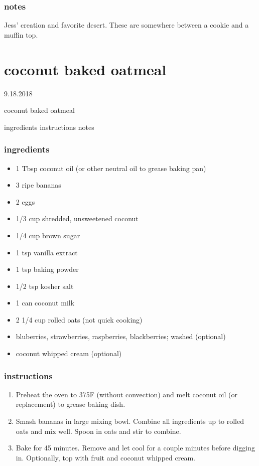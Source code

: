\documentclass[]{book}
\providecommand{\tightlist}{%
  \setlength{\itemsep}{0pt}\setlength{\parskip}{0pt}}
\begin{document}
\hypertarget{notes-21}{%
\subsection{notes}\label{notes-21}}

Jess' creation and favorite desert. These are somewhere between a cookie and a muffin top.

\hypertarget{coconut-baked-oatmeal}{%
\chapter{coconut baked oatmeal}\label{coconut-baked-oatmeal}}

9.18.2018

coconut baked oatmeal

ingredients \textbar{}
instructions \textbar{}
notes

\hypertarget{ingredients-22}{%
\subsection{ingredients}\label{ingredients-22}}

\begin{itemize}
\tightlist
\item
  1 Tbsp coconut oil (or other neutral oil to grease baking pan)
\item
  3 ripe bananas
\item
  2 eggs
\item
  1/3 cup shredded, unsweetened coconut
\item
  1/4 cup brown sugar
\item
  1 tsp vanilla extract
\item
  1 tsp baking powder
\item
  1/2 tsp kosher salt
\item
  1 can coconut milk
\item
  2 1/4 cup rolled oats (not quick cooking)
\item
  bluberries, strawberries, raspberries, blackberries; washed (optional)
\item
  coconut whipped cream (optional)
\end{itemize}

\hypertarget{instructions-22}{%
\subsection{instructions}\label{instructions-22}}

\begin{enumerate}
\def\labelenumi{\arabic{enumi}.}
\tightlist
\item
  Preheat the oven to 375F (without convection) and melt coconut oil (or replacement) to grease baking dish.
\item
  Smash bananas in large mixing bowl. Combine all ingredients up to rolled oats and mix well. Spoon in oats and
  stir to combine.
\item
  Bake for 45 minutes. Remove and let cool for a couple minutes before digging in. Optionally, top with fruit and
  coconut whipped cream.
\end{enumerate}
\end{document}
